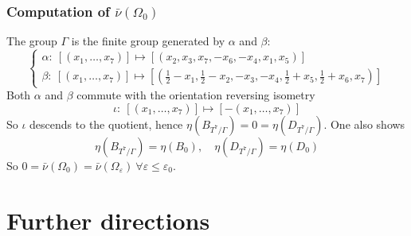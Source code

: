 \documentclass{beamer}
\newcommand{\ve}{\varepsilon}
\begin{document}
\begin{frame}
\frametitle{Computation of $\bar\nu(\Omega_0)$}
The group $\Gamma$ is the finite group generated by $\alpha$ and $\beta$:
\[
\begin{cases}
\alpha:\ [(x_1,\dots,x_7)]\mapsto [(x_2,x_3,x_7,-x_6,-x_4,x_1,x_5)]\\
\beta:\ [(x_1,\dots,x_7)]\mapsto \left[\left(\frac{1}{2}-x_1,\frac{1}{2}-x_2,-x_3,-x_4,\frac{1}{2}+x_5,\frac{1}{2}+x_6,x_7\right)\right]
\end{cases}
\]
Both $\alpha$ and $\beta$ commute with the orientation reversing isometry
\[
\iota:\ [(x_1,\dots,x_7)]\mapsto [-(x_1,\dots,x_7)]
\]
So $\iota$ descends to the quotient, hence $\eta(B_{T^7/\Gamma})=0=\eta(D_{T^7/\Gamma})$. One also shows
\[
\eta(B_{T^7/\Gamma})=\eta(B_0),\quad\eta(D_{T^7/\Gamma})=\eta(D_0)
\]
So $0=\bar\nu(\Omega_0)=\bar\nu(\Omega_\ve)\ \forall \ve\leq\ve_0$.
\end{frame}




\section{Further directions}
\end{document}
